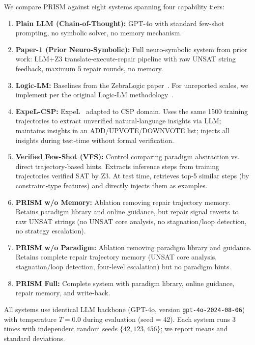 We compare PRISM against eight systems spanning four capability tiers:

\begin{enumerate}
    \item \textbf{Plain LLM (Chain-of-Thought):} GPT-4o with standard few-shot prompting, no symbolic solver, no memory mechanism.

    \item \textbf{Paper-1 (Prior Neuro-Symbolic):} Full neuro-symbolic system from prior work: LLM+Z3 translate-execute-repair pipeline with raw UNSAT string feedback, maximum 5 repair rounds, no memory.

    \item \textbf{Logic-LM:} Baselines from the ZebraLogic paper~\citep{lin2025zebralogic}. For unreported scales, we implement per the original Logic-LM methodology~\citep{pan2023logic}.

    \item \textbf{ExpeL-CSP:} ExpeL~\citep{zhao2024expel} adapted to CSP domain. Uses the same 1500 training trajectories to extract unverified natural-language insights via LLM; maintains insights in an ADD/UPVOTE/DOWNVOTE list; injects all insights during test-time without formal verification.

    \item \textbf{Verified Few-Shot (VFS):} Control comparing paradigm abstraction vs. direct trajectory-based hints. Extracts inference steps from training trajectories verified SAT by Z3. At test time, retrieves top-5 similar steps (by constraint-type features) and directly injects them as examples.

    \item \textbf{PRISM w/o Memory:} Ablation removing repair trajectory memory. Retains paradigm library and online guidance, but repair signal reverts to raw UNSAT strings (no UNSAT core analysis, no stagnation/loop detection, no strategy escalation).

    \item \textbf{PRISM w/o Paradigm:} Ablation removing paradigm library and guidance. Retains complete repair trajectory memory (UNSAT core analysis, stagnation/loop detection, four-level escalation) but no paradigm hints.

    \item \textbf{PRISM Full:} Complete system with paradigm library, online guidance, repair memory, and write-back.
\end{enumerate}

All systems use identical LLM backbone (GPT-4o, version \texttt{gpt-4o-2024-08-06}) with temperature $T = 0.0$ during evaluation (seed = 42). Each system runs 3 times with independent random seeds $\{42, 123, 456\}$; we report means and standard deviations.

